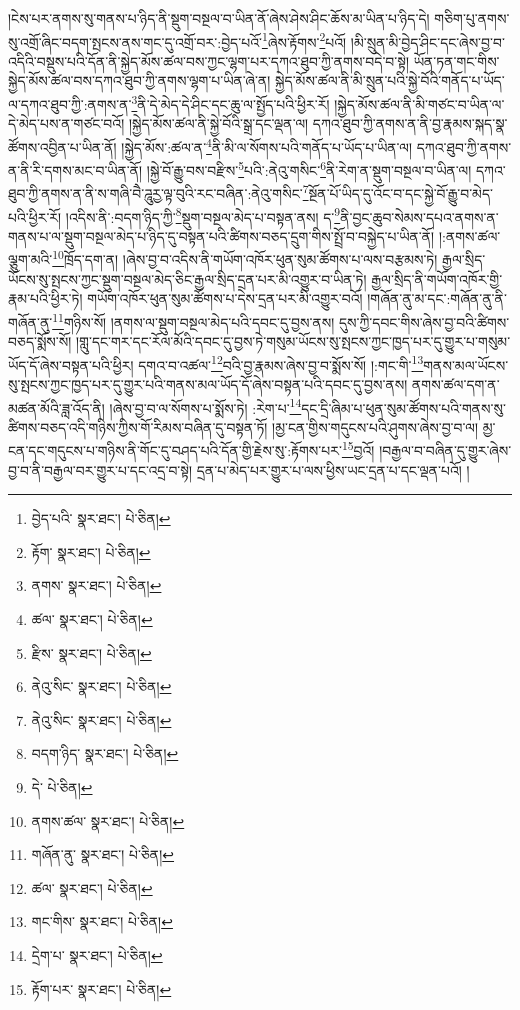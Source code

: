 །ངེས་པར་ནགས་སུ་གནས་པ་ཉིད་ནི་སྡུག་བསྔལ་བ་ཡིན་ནོ་ཞེས་ཤེས་ཤིང་ཆོས་མ་ཡིན་པ་ཉིད་དེ། གཅིག་པུ་ནགས་སུ་འགྲོ་ཞིང་བདག་སྤངས་ནས་གང་དུ་འགྲོ་བར་:བྱེད་པའོ་\footnote{བྱེད་པའི་  སྣར་ཐང་།  པེ་ཅིན། }ཞེས་རྟོགས་\footnote{རྟོག་  སྣར་ཐང་།  པེ་ཅིན། }པའོ། །མི་སྲུན་མི་བྱེད་ཤིང་དང་ཞེས་བྱ་བ་འདིའི་བསྡུས་པའི་དོན་ནི་སྐྱེད་མོས་ཚལ་བས་ཀྱང་ལྷག་པར་དཀའ་ཐུབ་ཀྱི་ནགས་བདེ་བ་སྟེ། ཡོན་ཏན་གང་གིས་སྐྱེད་མོས་ཚལ་བས་དཀའ་ཐུབ་ཀྱི་ནགས་ལྷག་པ་ཡིན་ཞེ་ན། སྐྱེད་མོས་ཚལ་ནི་མི་སྲུན་པའི་སྐྱེ་བོའི་གནོད་པ་ཡོད་ལ་དཀའ་ཐུབ་ཀྱི་:ནགས་ན་\footnote{ནགས་  སྣར་ཐང་།  པེ་ཅིན། }ནི་དེ་མེད་དེ་ཤིང་དང་ཆུ་ལ་སྤྱོད་པའི་ཕྱིར་རོ། །སྐྱེད་མོས་ཚལ་ནི་མི་གཙང་བ་ཡིན་ལ་དེ་མེད་པས་ན་གཙང་བའོ། །སྐྱེད་མོས་ཚལ་ནི་སྐྱེ་བོའི་སྒྲ་དང་ལྡན་ལ། དཀའ་ཐུབ་ཀྱི་ནགས་ན་ནི་བྱ་རྣམས་སྐད་སྣ་ཚོགས་འབྱིན་པ་ཡིན་ནོ། །སྐྱེད་མོས་:ཚལ་ན་\footnote{ཚལ་  སྣར་ཐང་།  པེ་ཅིན། }ནི་མི་ལ་སོགས་པའི་གནོད་པ་ཡོད་པ་ཡིན་ལ། དཀའ་ཐུབ་ཀྱི་ནགས་ན་ནི་རི་དགས་མང་བ་ཡིན་ནོ། །སྐྱེ་བོ་རྒྱུ་བས་བརྫིས་\footnote{རྫིས་  སྣར་ཐང་།  པེ་ཅིན། }པའི་:ནེའུ་གསིང་\footnote{ནེའུ་སིང་  སྣར་ཐང་།  པེ་ཅིན། }ནི་རེག་ན་སྡུག་བསྔལ་བ་ཡིན་ལ། དཀའ་ཐུབ་ཀྱི་ནགས་ན་ནི་ས་གཞི་བཻ་ཌཱུརྱ་ལྟ་བུའི་རང་བཞིན་:ནེའུ་གསིང་\footnote{ནེའུ་སིང་  སྣར་ཐང་།  པེ་ཅིན། }སྔོན་པོ་ཡིད་དུ་འོང་བ་དང་སྐྱེ་བོ་རྒྱུ་བ་མེད་པའི་ཕྱིར་རོ། །འདིས་ནི་:བདག་ཉིད་ཀྱི་\footnote{བདག་ཉིད་  སྣར་ཐང་།  པེ་ཅིན། }སྡུག་བསྔལ་མེད་པ་བསྟན་ནས། ད་\footnote{དེ་  པེ་ཅིན། }ནི་བྱང་ཆུབ་སེམས་དཔའ་ནགས་ན་གནས་པ་ལ་སྡུག་བསྔལ་མེད་པ་ཉིད་དུ་བསྟན་པའི་ཚིགས་བཅད་དྲུག་གིས་སྤྲོ་བ་བསྐྱེད་པ་ཡིན་ནོ། །:ནགས་ཚལ་ལྕུག་མའི་\footnote{ནགས་ཚལ་  སྣར་ཐང་།  པེ་ཅིན། }ཁྲོད་དག་ན། །ཞེས་བྱ་བ་འདིས་ནི་གཡོག་འཁོར་ཕུན་སུམ་ཚོགས་པ་ལས་བརྩམས་ཏེ། རྒྱལ་སྲིད་ཡོངས་སུ་སྤངས་ཀྱང་སྡུག་བསྔལ་མེད་ཅིང་རྒྱལ་སྲིད་དྲན་པར་མི་འགྱུར་བ་ཡིན་ཏེ། རྒྱལ་སྲིད་ནི་གཡོག་འཁོར་གྱི་རྣམ་པའི་ཕྱིར་ཏེ། གཡོག་འཁོར་ཕུན་སུམ་ཚོགས་པ་དེས་དྲན་པར་མི་འགྱུར་བའོ། །གཞོན་ནུ་མ་དང་:གཞོན་ནུ་ནི་གཞོན་ནུ་\footnote{གཞོན་ནུ་  སྣར་ཐང་།  པེ་ཅིན། }གཉིས་སོ། །ནགས་ལ་སྡུག་བསྔལ་མེད་པའི་དབང་དུ་བྱས་ནས། དུས་ཀྱི་དབང་གིས་ཞེས་བྱ་བའི་ཚིགས་བཅད་སྨོས་སོ། །གླུ་དང་གར་དང་རོལ་མོའི་དབང་དུ་བྱས་ཏེ་གསུམ་ཡོངས་སུ་སྤངས་ཀྱང་ཁྱད་པར་དུ་གྱུར་པ་གསུམ་ཡོད་དོ་ཞེས་བསྟན་པའི་ཕྱིར། དགའ་བ་འཚལ་\footnote{ཚལ་  སྣར་ཐང་།  པེ་ཅིན། }བའི་བྱ་རྣམས་ཞེས་བྱ་བ་སྨོས་སོ། །:གང་གི་\footnote{གང་གིས་  སྣར་ཐང་།  པེ་ཅིན། }གནས་མལ་ཡོངས་སུ་སྤངས་ཀྱང་ཁྱད་པར་དུ་གྱུར་པའི་གནས་མལ་ཡོད་དོ་ཞེས་བསྟན་པའི་དབང་དུ་བྱས་ནས། ནགས་ཚལ་དག་ན་མཚན་མོའི་ཟླ་འོད་ནི། །ཞེས་བྱ་བ་ལ་སོགས་པ་སྨོས་ཏེ། :རེག་པ་\footnote{དྲེག་པ་  སྣར་ཐང་།  པེ་ཅིན། }དང་དྲི་ཞིམ་པ་ཕུན་སུམ་ཚོགས་པའི་གནས་སུ་ཚིགས་བཅད་འདི་གཉིས་ཀྱིས་གོ་རིམས་བཞིན་དུ་བསྟན་ཏོ། །མྱ་ངན་གྱིས་གདུངས་པའི་ཤུགས་ཞེས་བྱ་བ་ལ། མྱ་ངན་དང་གདུངས་པ་གཉིས་ནི་གོང་དུ་བཤད་པའི་དོན་གྱི་རྗེས་སུ་:རྟོགས་པར་\footnote{རྟོག་པར་  སྣར་ཐང་།  པེ་ཅིན། }བྱའོ། །བརྒྱལ་བ་བཞིན་དུ་གྱུར་ཞེས་བྱ་བ་ནི་བརྒྱལ་བར་གྱུར་པ་དང་འདྲ་བ་སྟེ། དྲན་པ་མེད་པར་གྱུར་པ་ལས་ཕྱིས་ཡང་དྲན་པ་དང་ལྡན་པའོ། །
